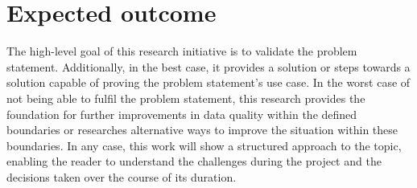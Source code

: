 



\section{Expected outcome}

The high-level goal of this research initiative is to validate the problem statement. Additionally, in the best case, it provides a solution or steps towards a solution capable of proving the problem statement's use case. In the worst case of not being able to fulfil the problem statement, this research provides the foundation for further improvements in data quality within the defined boundaries or researches alternative ways to improve the situation within these boundaries. In any case, this work will show a structured approach to the topic, enabling the reader to understand the challenges during the project and the decisions taken over the course of its duration.
